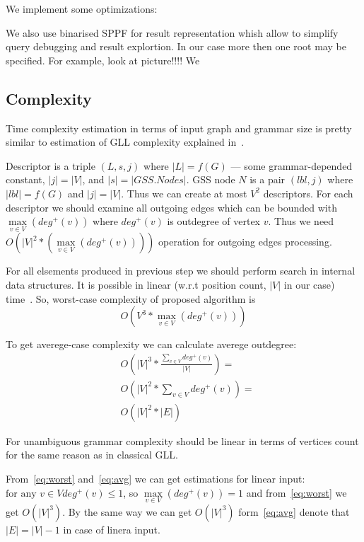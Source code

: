 \documentclass{sig-alternate} %
\begin{document}
We implement some optimizations:~\cite{FastPracticalGLL}

We also use binarised SPPF for result representation whish allow to simplify query debugging and result explortion.
In our case more then one root may be specified. For example, look at picture!!!! 
We 

\subsection{Complexity}

Time complexity estimation in terms of input graph and grammar size is pretty similar to estimation of GLL complexity explained in~\cite{modellingGLL}.

Descriptor is a triple $(L, s, j)$ where $|L| = f(G)$ --- some grammar-depended constant, $|j| = |V|$, and $|s| = |GSS.Nodes|$.
GSS node $N$ is a pair $(lbl, j)$ where $|lbl| = f(G)$ and $|j| = |V|$. 
Thus we can create at most $V^2$ descriptors.
For each descriptor we should examine all outgoing edges which can be bounded with $\max\limits_{v \in V}(deg^+(v))$  where $deg^+(v)$ is outdegree of vertex $v$.
Thus we need $O(|V|^2*(\max\limits_{v \in V}(deg^+(v))))$ operation for outgoing edges processing.

For all elsements produced in previous step we should perform search in internal data structures. It is possible in linear (w.r.t position count, $|V|$ in our case) time~\cite{modellingGLL}.
So, worst-case complexity of proposed algorithm is 
\begin{equation} \label{eq:worst}
O(V^3*\max\limits_{v \in V}(deg^+(v)))
\end{equation}

To get averege-case complexity we can calculate averege outdegree:
\begin{align} \label{eq:avg}
  & O\left(|V|^3*\frac {\sum\limits_{v \in V} deg^+(v)}{|V|}\right) = \\
  & O\left(|V|^2*\sum\limits_{v \in V} deg^+(v)\right) = \\
  & O\left(|V|^2*|E|\right) 
\end{align}

For unambiguous grammar complexity should be linear in terms of vertices count for the same reason as in classical GLL.

From~\ref{eq:worst} and~\ref{eq:avg} we can get estimations for linear input: $\text{for any } v \in V deg^+(v) \leq 1$, so $\max\limits_{v \in V}(deg^+(v))  = 1 $ and from~\ref{eq:worst} we get $O(|V|^3)$. 
By the same way we can get $O(|V|^3)$ form~\ref{eq:avg} denote that $|E| = |V| - 1$ in case of linera input. 
\end{document}
